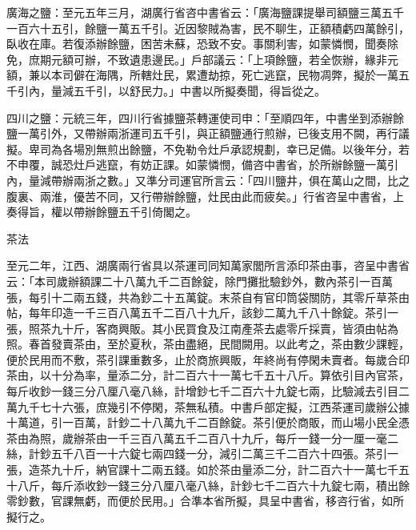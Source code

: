 \begin{pinyinscope}
 廣海之鹽：至元五年三月，湖廣行省咨中書省云：「廣海鹽課提舉司額鹽三萬五千一百六十五引，餘鹽一萬五千引。近因黎賊為害，民不聊生，正額積虧四萬餘引，臥收在庫。若復添辦餘鹽，困苦未蘇，恐致不安。事關利害，如蒙憐憫，聞奏除免，庶期元額可辦，不致遺患邊民。」戶部議云：「上項餘鹽，若全恢辦，緣非元額，兼以本司僻在海隅，所轄灶民，累遭劫掠，死亡逃竄，民物凋弊，擬於一萬五千引內，量減五千引，以舒民力。」中書以所擬奏聞，得旨從之。



 四川之鹽：元統三年，四川行省據鹽茶轉運使司申：「至順四年，中書坐到添辦餘鹽一萬引外，又帶辦兩浙運司五千引，與正額鹽通行煎辦，已後支用不闕，再行議擬。卑司為各場別無煎出餘鹽，不免勒令灶戶承認規劃，幸已足備。以後年分，若不申覆，誠恐灶戶逃竄，有妨正課。如蒙憐憫，備咨中書省，於所辦餘鹽一萬引內，量減帶辦兩浙之數。」又準分司運官所言云：「四川鹽井，俱在萬山之間，比之腹裏、兩淮，優苦不同，又行帶辦餘鹽，灶民由此而疲矣。」行省咨呈中書省，上奏得旨，權以帶辦餘鹽五千引倚閣之。



 茶法



 至元二年，江西、湖廣兩行省具以茶運司同知萬家閭所言添印茶由事，咨呈中書省云：「本司歲辦額課二十八萬九千二百餘錠，除門攤批驗鈔外，數內茶引一百萬張，每引十二兩五錢，共為鈔二十五萬錠。末茶自有官印筒袋關防，其零斤草茶由帖，每年印造一千三百八萬五千二百八十九斤，該鈔二萬九千八十餘錠。茶引一張，照茶九十斤，客商興販。其小民買食及江南產茶去處零斤採賣，皆須由帖為照。春首發賣茶由，至於夏秋，茶由盡絕，民間闕用。以此考之，茶由數少課輕，便於民用而不敷，茶引課重數多，止於商旅興販，年終尚有停閑未賣者。每歲合印茶由，以十分為率，量添二分，計二百六十一萬七千五十八斤。算依引目內官茶，每斤收鈔一錢三分八厘八毫八絲，計增鈔七千二百六十九錠七兩，比驗減去引目二萬九千七十六張，庶幾引不停閑，茶無私積。中書戶部定擬，江西茶運司歲辦公據十萬道，引一百萬，計鈔二十八萬九千二百餘錠。茶引便於商販，而山場小民全憑茶由為照，歲辦茶由一千三百八萬五千二百八十九斤，每斤一錢一分一厘一毫二絲，計鈔五千八百一十六錠七兩四錢一分，減引二萬三千二百六十四張。茶引一張，造茶九十斤，納官課十二兩五錢。如於茶由量添二分，計二百六十一萬七千五十八斤，每斤添收鈔一錢三分八厘八毫八絲，計鈔七千二百六十九錠七兩，積出餘零鈔數，官課無虧，而便於民用。」合準本省所擬，具呈中書省，移咨行省，如所擬行之。




\end{pinyinscope}
